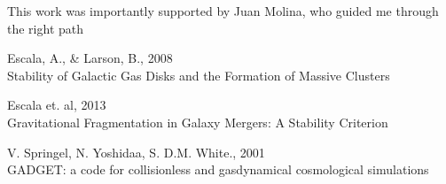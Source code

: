 \documentclass{aa}
\begin{document}
\begin{acknowledgements}
      This work was importantly supported by Juan Molina, who guided me through the right path  
\end{acknowledgements}



\begin{thebibliography}{}

   Escala, A., \& Larson, B., 2008 \\
      Stability of Galactic Gas Disks and the Formation of Massive Clusters
      

    Escala et. al, 2013\\
      Gravitational Fragmentation in Galaxy Mergers: A Stability Criterion
      
    V. Springel, N. Yoshidaa, S. D.M. White., 2001 \\
      GADGET: a code for collisionless and gasdynamical cosmological simulations



   
  


\end{thebibliography}
\end{document}
